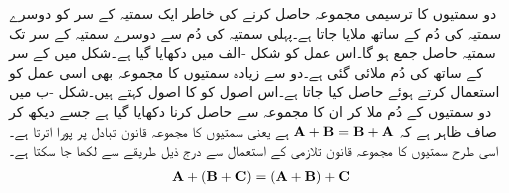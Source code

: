 دو سمتیوں کا ترسیمی  مجموعہ حاصل کرنے کی خاطر ایک سمتیہ کے سر کو دوسرے سمتیہ کی دُم  کے ساتھ ملایا جاتا ہے۔پہلی سمتیہ کی دُم سے دوسرے سمتیہ کے سر تک سمتیہ حاصل جمع ہو گا۔اس عمل کو شکل -الف میں دکھایا گیا ہے۔شکل میں  کے سر کے ساتھ  کی دُم ملائی گئی ہے۔دو سے زیادہ سمتیوں کا مجموعہ بھی اسی عمل کو استعمال کرتے  ہوئے حاصل کیا جاتا ہے۔اس اصول کو  کا اصول کہتے ہیں۔شکل -ب میں دو سمتیوں کے دُم ملا کر ان کا مجموعہ  سے حاصل کرنا دکھایا گیا ہے جسے دیکھ کر صاف ظاہر ہے کہ $\bf{A}+\bf{B}=\bf{B}+\bf{A}$ ہے یعنی سمتیوں کا مجموعہ قانون تبادل پر پورا اترتا ہے۔اسی طرح سمتیوں کا مجموعہ قانون تلازمی کے استعمال سے درج ذیل طریقے سے لکھا جا سکتا ہے۔
\begin{align}
\bf{A}+\left(\bf{B}+\bf{C}\right)=\left(\bf{A}+\bf{B}\right)+\bf{C}
\end{align}
\begin{comment}
\begin{figure}
\centering
\begin{subfigure}{0.5\textwidth}
\centering
\texttt{[image: figVectorHeadToTailRule]}
\caption{سر کے ساتھ دُم جوڑ کر مجموعہ حاصل کیا جاتا ہے۔}
\end{subfigure}%
%
\begin{subfigure}{0.5\textwidth}
\centering
\texttt{[image: figVectorParallelogramAdditionLaw]}
\caption{متوازی الاضلاع سے بھی مجموعہ حاصل کیا جاتا ہے۔}
\end{subfigure}%
\caption{سمتیوں کے مجموعے کا حصول}
\label{شکل_سمتیہ_سمتیوں_کا_مجموعہ}
\end{figure}
\end{comment}

